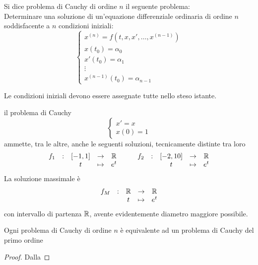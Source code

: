 \begin{definition}
	Si dice problema di Cauchy di ordine $n$ il seguente problema:\\
	Determinare una soluzione di un'equazione differenziale ordinaria di ordine $n$ soddisfacente a $n$ condizioni iniziali:
	\[\begin{cases}
		x^{(n)}=f(t,x,x',\dotsc,x^{(n-1)})\\
		x(t_0)=\alpha_0\\
		x'(t_0)=\alpha_1\\
		\vdots\\
		x^{(n-1)}(t_0)=\alpha_{n-1}
	\end{cases}\]
\end{definition}
\begin{note}
	Le condizioni iniziali devono essere assegnate tutte nello steso istante.
\end{note}
\begin{example}
	il problema di Cauchy \[\begin{cases}x'=x\\x(0)=1\end{cases}\]
	ammette, tra le altre, anche le seguenti soluzioni, tecnicamente distinte tra loro
	\[\begin{array}{ccccc} {f_1} & : & { \left[-1,1\right] } & \to & {\mathbb{R}} \\ & & {t} & \mapsto & {e^t} \\ \end{array} \qquad \begin{array}{ccccc} {f_2} & : & { \left[-2,10\right] } & \to & {\mathbb{R}} \\ & & {t} & \mapsto & {e^t} \\ \end{array}\]
	La soluzione massimale è
	\[\begin{array}{ccccc} {f_M} & : & {\mathbb{R}} & \to & {\mathbb{R}} \\ & & {t} & \mapsto & {e^t} \\ \end{array}\]
	con intervallo di partenza $\mathbb{R}$, avente evidentemente diametro maggiore possibile.
\end{example}
\begin{proposition}
	Ogni problema di Cauchy di ordine $n$ è equivalente ad un problema di Cauchy del primo ordine
	\begin{proof}
		Dalla 
	\end{proof}
\end{proposition}


